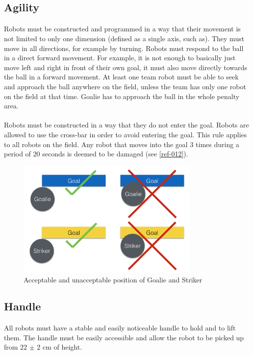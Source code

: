 \documentclass{article}
\newcommand*{\p}{\paragraph{}}
\begin{document}
\subsection{Agility \label{ref-agility}}

\p Robots must be constructed and programmed in a way that their movement is not
limited to only one dimension (defined as a single axis, such as). They must
move in all directions, for example by turning. Robots must respond to the ball
in a direct forward movement. For example, it is not enough to basically just
move left and right in front of their own goal, it must also move directly
towards the ball in a forward movement. At least one team robot must be able to
seek and approach the ball anywhere on the field, unless the team has only one
robot on the field at that time. Goalie has to approach the ball in the whole
penalty area.

\p Robots must be constructed in a way that they do not enter the goal. Robots are
allowed to use the cross-bar in order to avoid entering the goal. This rule
applies to all robots on the field. Any robot that moves into the goal 3 times
during a period of 20 seconds is deemed to be damaged (see
\hyperref[ref-012]{\ref{ref-012}}).

\begin{figure}[H]
    \centering
    \includegraphics[width=0.8\textwidth]{media/image3.png}
    \caption{Acceptable and unacceptable position of Goalie and Striker}
    \label{fig:robot_in_goal}
\end{figure}

\subsection{ Handle \label{ref-handle}}

\p All robots must have a stable and easily noticeable handle to hold and to
lift them. The handle must be easily accessible and allow the robot to be
picked up from 22 $\pm$ 2 cm of height.
\end{document}
